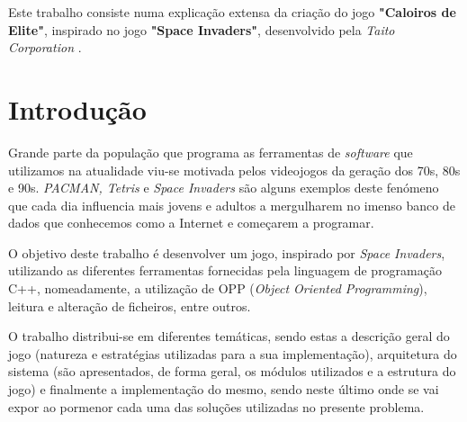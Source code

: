 \documentclass[a4paper,11pt]{article}
\newcommand\tab[1][0.8cm]{\hspace*{#1}}
\begin{document}
\tab Este trabalho consiste numa explicação extensa da criação do jogo \textbf{"Caloiros de Elite"}, inspirado no jogo \textbf{"Space Invaders"}, desenvolvido pela \textit{Taito Corporation} \cite{spaceInv}.  \par
\vspace{8pt}

     
\vspace{8pt}

\vspace{40pt}


\pagebreak

\pagebreak


\renewcommand{\contentsname}{Índice}        %
\tableofcontents
{}

\vspace{40pt}
\listoffigures

\vspace{40pt}
\listoftables

\pagebreak


\setcounter{secnumdepth}{3}


\section{Introdução}\label{Intro}

\setcounter{page}{1}
\tab 

\vspace{8pt}

Grande parte da população que programa as ferramentas de \textit{software} que utilizamos na atualidade viu-se motivada pelos videojogos da geração dos 70s, 80s e 90s. \textit{PACMAN, Tetris} e \textit{Space Invaders} são alguns exemplos deste fenómeno que cada dia influencia mais jovens e adultos a mergulharem no imenso banco de dados que conhecemos como a Internet e começarem a programar.

\vspace{8pt}

O objetivo deste trabalho é desenvolver um jogo, inspirado por \textit{Space Invaders}, utilizando as diferentes ferramentas fornecidas pela linguagem de programação C++, nomeadamente, a utilização de OPP (\textit{Object Oriented Programming}), leitura e alteração de ficheiros, entre outros.

\vspace{8pt}

O trabalho distribui-se em diferentes temáticas, sendo estas a descrição geral do jogo (natureza e estratégias utilizadas para a sua implementação),  arquitetura do sistema (são apresentados, de forma geral, os módulos utilizados e a estrutura do jogo) e finalmente a implementação do mesmo, sendo neste último onde se vai expor ao pormenor cada uma das soluções utilizadas no presente problema.
\end{document}
